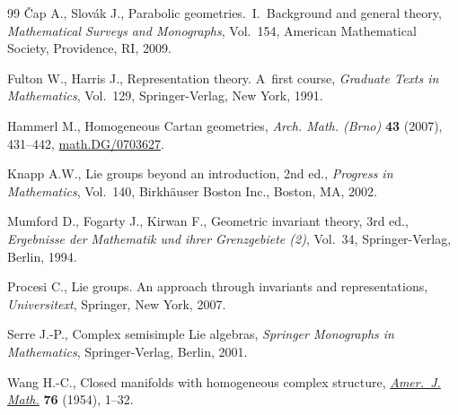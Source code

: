 \documentclass[11pt]{article}
\begin{document}
\begin{thebibliography}{99}
\v{C}ap A., Slov{\'a}k J.,
Parabolic geometries.~I.~Background and general theory,
{\em Mathematical Surveys and Monographs}, Vol.~154,
American Mathematical Society, Providence, RI, 2009.


 Fulton W.,  Harris J.,
  Representation theory. A~f\/irst course,
  {\em Graduate Texts in   Mathematics}, Vol.~129,
 Springer-Verlag, New York, 1991.

Hammerl M.,
Homogeneous Cartan geometries,
{\em Arch. Math. (Brno)} {\bf 43} (2007), 431--442,
\href{http://arxiv.org/abs/math.DG/0703627}{math.DG/0703627}.

 Knapp A.W.,
Lie groups beyond an introduction, 2nd ed.,
 {\em Progress   in Mathematics}, Vol.~140,
  Birkh\"auser Boston Inc., Boston, MA, 2002.

Mumford D., Fogarty J.,  Kirwan F.,
 Geometric invariant theory,  3rd ed., {\em Ergebnisse der
  Mathematik und ihrer Grenzgebiete (2)}, Vol.~34,
 Springer-Verlag, Berlin,   1994.

 Procesi C.,
Lie groups. An approach through invariants and representations, {\it Universitext}, Springer, New York, 2007.

 Serre J.-P.,
 Complex semisimple Lie algebras,
{\it Springer Monographs in Mathematics}, Springer-Verlag, Berlin, 2001.


 Wang H.-C.,
 Closed manifolds with homogeneous complex structure,
\href{http://dx.doi.org/10.2307/2372397}{{\em Amer.~J. Math.}} {\bf 76} (1954), 1--32.

\end{thebibliography}
\end{document}

